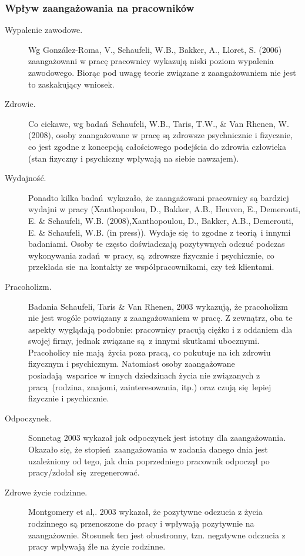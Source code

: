 \subsubsection{Wpływ zaangażowania na pracowników}
\begin{description}
\item[Wypalenie zawodowe.]
Wg González-Roma, V., Schaufeli, W.B., Bakker, A., Lloret, S. (2006) zaangażowani w pracę pracownicy wykazują niski poziom wypalenia zawodowego. Biorąc pod uwagę teorie związane z zaangażowaniem nie jest to zaskakujący wniosek.
\item[Zdrowie.]
Co ciekawe, wg badań Schaufeli, W.B., Taris, T.W., \& Van Rhenen, W. (2008), osoby zaangażowane w pracę są zdrowsze psychnicznie i fizycznie, co jest zgodne z koncepcją całościowego podejścia do zdrowia człowieka (stan fizyczny i psychiczny wpływają na siebie nawzajem).
\item[Wydajność.]
Ponadto kilka badań wykazało, że zaangażowani pracownicy są bardziej wydajni w pracy (Xanthopoulou, D., Bakker, A.B., Heuven, E., Demerouti, E. \& Schaufeli, W.B. (2008),Xanthopoulou, D., Bakker, A.B., Demerouti, E. \& Schaufeli, W.B. (in press)). Wydaje się to zgodne z teorią i innymi badaniami. Osoby te często doświadczają pozytywnych odczuć podczas wykonywania zadań w pracy, są zdrowsze fizycznie i psychicznie, co przekłada sie na kontakty ze współpracownikami, czy też klientami.
\item[Pracoholizm.]
Badania Schaufeli, Taris \& Van Rhenen, 2003 wykazują, że pracoholizm nie jest wogóle powiązany z zaangażowaniem w pracę. Z zewnątrz, oba te aspekty wyglądają podobnie: pracownicy pracują ciężko i z oddaniem dla swojej firmy, jednak związane są z innymi skutkami ubocznymi. Pracoholicy nie mają życia poza pracą, co pokutuje na ich zdrowiu fizycznym i psychicznym. Natomiast osoby zaangażowane posiadają wsparice w innych dziedzinach życia nie związanych z pracą (rodzina,
znajomi, zainteresowania, itp.) oraz czują się lepiej fizycznie i psychicznie.
\item[Odpoczynek.]
Sonnetag 2003 wykazał jak odpoczynek jest istotny dla zaangażowania. Okazało się, że stopień zaangażowania w zadania danego dnia jest uzależniony od tego, jak dnia poprzedniego pracownik odpoczął po pracy/zdołał się zregenerować.
\item[Zdrowe życie rodzinne.]
Montgomery et al,. 2003 wykazał, że pozytywne odczucia z życia rodzinnego są przenoszone do pracy i wpływają pozytywnie na zaangażownie. Stosunek ten jest obustronny, tzn. negatywne odczucia z pracy wpływają źle na życie rodzinne. 


\end{description}
